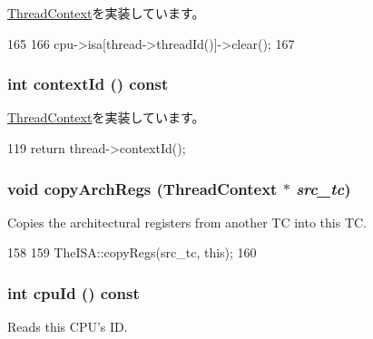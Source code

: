 \hyperlink{classThreadContext_ae0375c0a094eeb6fe8f73db4393d4ceb}{ThreadContext}を実装しています。


\begin{DoxyCode}
165 {
166     cpu->isa[thread->threadId()]->clear();
167 }
\end{DoxyCode}
\hypertarget{classInOrderThreadContext_a651d5d14e7a4e95ebe6d7f5b8ee5a107}{
\subsubsection[{contextId}]{\setlength{\rightskip}{0pt plus 5cm}int contextId () const}}
\label{classInOrderThreadContext_a651d5d14e7a4e95ebe6d7f5b8ee5a107}


\hyperlink{classThreadContext_a5a3ce3f955d2ec16ac6f2aa21e42f3a0}{ThreadContext}を実装しています。


\begin{DoxyCode}
119 { return thread->contextId(); }
\end{DoxyCode}
\hypertarget{classInOrderThreadContext_a60ea17de8baed42e666abb02b172c111}{
\subsubsection[{copyArchRegs}]{\setlength{\rightskip}{0pt plus 5cm}void copyArchRegs ({\bf ThreadContext} $\ast$ {\em src\_\-tc})}}
\label{classInOrderThreadContext_a60ea17de8baed42e666abb02b172c111}
Copies the architectural registers from another TC into this TC. 


\begin{DoxyCode}
158 {
159     TheISA::copyRegs(src_tc, this);
160 }
\end{DoxyCode}
\hypertarget{classInOrderThreadContext_a1e2d18ebf4e21f2416c21a8b072e2c7b}{
\subsubsection[{cpuId}]{\setlength{\rightskip}{0pt plus 5cm}int cpuId () const}}
\label{classInOrderThreadContext_a1e2d18ebf4e21f2416c21a8b072e2c7b}
Reads this CPU's ID. 

